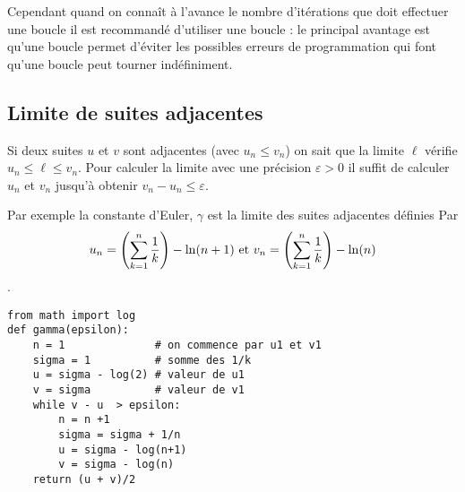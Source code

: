Cependant quand on connaît à l'avance le nombre d'itérations que doit effectuer une boucle il est recommandé d'utiliser une boucle  : le principal avantage est qu'une boucle  permet d'éviter les possibles erreurs de programmation qui font qu'une boucle  peut tourner indéfiniment.
\subsection{Limite de suites adjacentes}
Si deux suites $u$ et $v$ sont adjacentes (avec $u_n\le v_n$) on sait que la limite $\ell$ vérifie $u_n\le \ell \le v_n$. Pour calculer la limite avec une précision $\varepsilon > 0$ il suffit de calculer $u_n$ et $v_n$ jusqu'à obtenir $v_n - u_n\le \varepsilon$. 

Par exemple la constante d'Euler, $\gamma$ est la limite des suites adjacentes définies Par
\[ u_n = \left( \sum_{k=1}^n \frac 1k\right)-\ln(n+1)
\hbox{ et }v_n = \left( \sum_{k=1}^n \frac 1k\right)-\ln(n)\].
\begin{lstlisting}
from math import log
def gamma(epsilon):
    n = 1              # on commence par u1 et v1
    sigma = 1          # somme des 1/k
    u = sigma - log(2) # valeur de u1
    v = sigma          # valeur de v1
    while v - u  > epsilon:
        n = n +1
        sigma = sigma + 1/n
        u = sigma - log(n+1)
        v = sigma - log(n)
    return (u + v)/2
\end{lstlisting}
